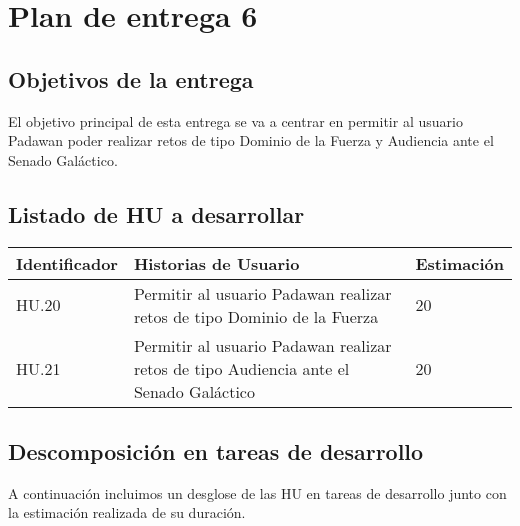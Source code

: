 \section{Plan de entrega 6}

\subsection{Objetivos de la entrega}

El objetivo principal de esta entrega se va a centrar en permitir al usuario Padawan poder realizar retos de tipo Dominio de la Fuerza y Audiencia ante el Senado Galáctico.

\subsection{Listado de HU a desarrollar}

\begin{table}[h]
	\centering
	\begin{tabular}{| p{2.3cm} | p{6.7cm} | p{2cm} |}
		\rowcolor[HTML]{329A9D} 
		{\color[HTML]{FFFFFF} \textbf{Identificador}} & {\color[HTML]{FFFFFF} \textbf{Historias de Usuario}} & {\color[HTML]{FFFFFF} \textbf{Estimación}}  \\ \hline
		HU.20 & Permitir al usuario Padawan realizar retos de tipo Dominio de la Fuerza & 20 \\ \hline
		HU.21 & Permitir al usuario Padawan realizar retos de tipo Audiencia ante el Senado Galáctico & 20 \\ \hline
	\end{tabular}
\end{table}


\subsection{Descomposición en tareas de desarrollo}

A continuación incluimos un desglose de las HU en tareas de desarrollo junto con la estimación realizada de su duración.\\

